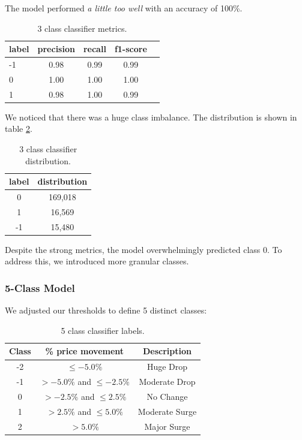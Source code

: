 \documentclass[twocolumn]{article}
\begin{document}
The model performed \textit{a little too well} with an accuracy of 100\%.

\begin{table}[h!]
\centering
\small
\begin{tabular}{|l|c|c|c|c|}
\hline
\textbf{label} & \textbf{precision} & \textbf{recall} & \textbf{f1-score} \\
\hline
           -1    &   0.98    &   0.99   &    0.99    \\
            0    &    1.00   &    1.00  &     1.00    \\ 
            1    &    0.98   &    1.00   &    0.99    \\
\hline
\end{tabular}
\caption{3 class classifier metrics.}
\label{tab:3-class-metrics}
\end{table}


We noticed that there was a huge class imbalance. The distribution is shown in table \ref{tab:3-class-distribution}.

\begin{table}[h!]
\centering
\small
\begin{tabular}{|c|c|}
\hline
\textbf{label} & \textbf{distribution} \\
\hline
  0   & 169,018 \\
  1   &  16,569 \\ 
 -1   &  15,480 \\ 
\hline
\end{tabular}
\caption{3 class classifier distribution.}
\label{tab:3-class-distribution}
\end{table}

Despite the strong metrics, the model overwhelmingly predicted class 0. To address this, we introduced more granular classes.

\subsubsection*{5-Class Model}

We adjusted our thresholds to define 5 distinct classes:

\begin{table}[h!]
\centering
\small
\begin{tabular}{|c|c|c|}
\hline
\textbf{Class} & \textbf{\% price movement} & \textbf{Description} \\
\hline
-2 & $\leq -5.0\%$ & Huge Drop  \\
-1 & $> -5.0\%$ and $\leq -2.5\%$ & Moderate Drop  \\
 0 & $> -2.5\%$ and $\leq 2.5\%$ & No Change \\
 1 & $> 2.5\%$ and $\leq 5.0\%$ & Moderate Surge  \\
 2 & $> 5.0\%$ & Major Surge  \\
\hline
\end{tabular}
\caption{5 class classifier labels.}
\label{tab:5-class-labels}
\end{table}
\end{document}
